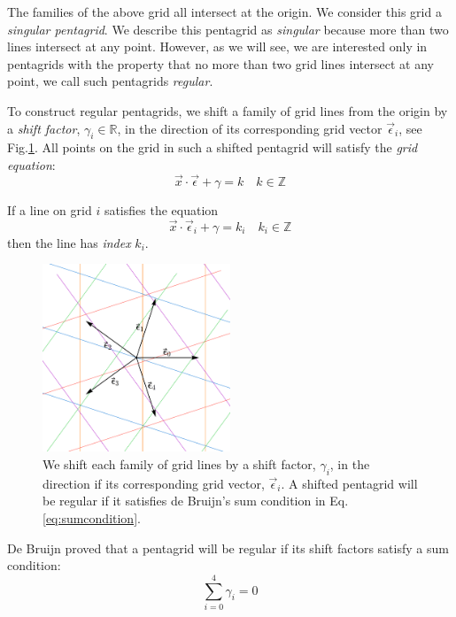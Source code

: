 \documentclass[
  oneside,
  11pt, a4paper,
  footinclude=true,
  headinclude=true,
  cleardoublepage=empty
]{scrbook}
\begin{document}
The families of the above grid all intersect at the origin. We consider this grid a \textit{singular pentagrid}. We describe this pentagrid as \textit{singular} because more than two lines intersect at any point. However, as we will see, we are interested only in pentagrids with the property that no more than two grid lines intersect at any point, we call such pentagrids \textit{regular}.

To construct regular pentagrids, we shift a family of grid lines from the origin by a \textit{shift factor}, $\gamma_i \in \mathbb{R}$, in the direction of its corresponding grid vector $\vec{\epsilon}_i$, see Fig.\ref{fig:regularpentagrid}. All points on the grid in such a shifted pentagrid will satisfy the \textit{grid equation}:
\begin{equation}
\vec{x}\cdot\vec{\epsilon}+\gamma=k \quad k\in\mathbb{Z}
\end{equation}

If a line on grid $i$ satisfies the equation
\begin{equation}
\vec{x}\cdot\vec{\epsilon}_i+\gamma=k_i \quad k_i\in\mathbb{Z}
\end{equation}
then the line has \textit{index} $k_i$.

\begin{figure}[H]
\centering
\includegraphics[width=0.5\textwidth]{RegularPentagrid}
\caption[Regular Pentagrid]{We shift each family of grid lines by a shift factor,  $\gamma_i$, in the direction if its corresponding grid vector, $\vec{\epsilon}_i$. A shifted pentagrid will be regular if it satisfies de Bruijn's sum condition in Eq.\ref{eq:sumcondition}.}
\label{fig:regularpentagrid}
\end{figure}

De Bruijn proved that a pentagrid will be regular if its shift factors satisfy a sum condition:
\begin{equation}
\sum_{i=0}^{4}\gamma_i=0
\label{eq:sumcondition}
\end{equation}
\end{document}
